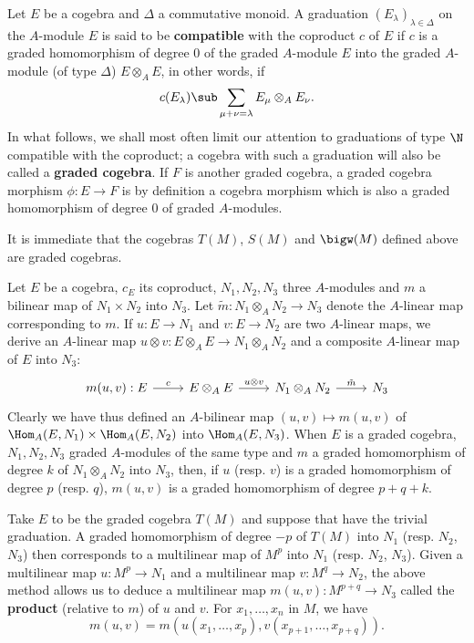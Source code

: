 Let $E$ be a cogebra and $\Delta$ a commutative monoid. A graduation $(E_\lambda)_{\lambda\in\Delta}$ on the $A$-module $E$ is said to be \textbf{compatible} with the coproduct $c$ of $E$ if $c$ is a graded homomorphism of degree $0$ of the graded $A$-module $E$ into the graded $A$-module (of type $\Delta$) $E\otimes_AE$, in other words, if
\begin{align}\label{cogebra compatible with graduation def}
c(E_\lambda)\sub\sum_{\mu+\nu=\lambda}E_\mu\otimes_A E_\nu.
\end{align}
In what follows, we shall most often limit our attention to graduations of type $\N$ compatible with the coproduct; a cogebra with such a graduation will also be called a \textbf{graded cogebra}. If $F$ is another graded cogebra, a graded cogebra morphism $\phi:E\to F$ is by definition a cogebra morphism which is also a graded homomorphism of degree $0$ of graded $A$-modules.
\begin{example}
It is immediate that the cogebras $T(M)$, $S(M)$ and $\bigw(M)$ defined above are graded cogebras.
\end{example}
Let $E$ be a cogebra, $c_E$ its coproduct, $N_1,N_2,N_3$ three $A$-modules and $m$ a bilinear map of $N_1\times N_2$ into $N_3$. Let $\tilde{m}:N_1\otimes_AN_2\to N_3$ denote the $A$-linear map corresponding to $m$. If $u:E\to N_1$ and $v:E\to N_2$ are two $A$-linear maps, we derive an $A$-linear map $u\otimes v:E\otimes_AE\to N_1\otimes_AN_2$ and a composite $A$-linear map of $E$ into $N_3$:
\[\begin{tikzcd}
m(u,v):E\ar[r,"c"]&E\otimes_AE\ar[r,"u\otimes v"]&N_1\otimes_AN_2\ar[r,"\tilde{m}"]&N_3
\end{tikzcd}\]
Clearly we have thus defined an $A$-bilinear map $(u,v)\mapsto m(u,v)$ of $\Hom_A(E,N_1)\times\Hom_A(E,N_2)$ into $\Hom_A(E,N_3)$. When $E$ is a graded cogebra, $N_1,N_2,N_3$ graded $A$-modules of the same type and $m$ a graded homomorphism of degree $k$ of $N_1\otimes_AN_2$ into $N_3$, then, if $u$ (resp. $v$) is a graded homomorphism of degree $p$ (resp. $q$), $m(u,v)$ is a graded homomorphism of degree $p+q+k$.
\begin{example}
Take $E$ to be the graded cogebra $T(M)$ and suppose that  have the trivial graduation. A graded homomorphism of degree $-p$ of $T(M)$ into $N_1$ (resp. $N_2$, $N_3$) then corresponds to a multilinear map of $M^p$ into $N_1$ (resp. $N_2$, $N_3$). Given a multilinear map $u:M^p\to N_1$ and a multilinear map $v:M^q\to N_2$, the above method allows us to deduce a multilinear map $m(u,v):M^{p+q}\to N_3$ called the \textbf{product} (relative to $m$) of $u$ and $v$. For $x_1,\dots,x_n$ in $M$, we have
\[m(u,v)=m(u(x_1,\dots,x_p),v(x_{p+1},\dots,x_{p+q})).\] 
\end{example}
